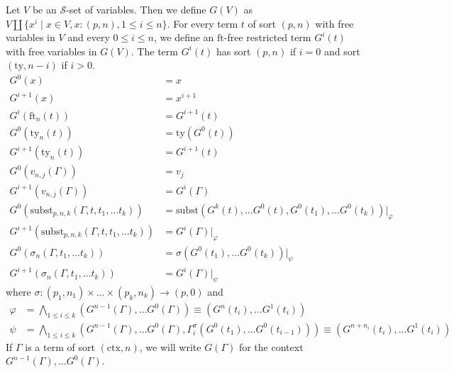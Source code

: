 \documentclass[reqno]{amsart}
\theoremstyle{definition}
\theoremstyle{remark}
\newcommand{\fs}[1]{\mathrm{#1}}
\newcommand{\subst}{\fs{subst}}
\newcommand{\ft}{\fs{ft}}
\newcommand{\ty}{\fs{ty}}
\newcommand{\ctx}{\fs{ctx}}
\numberwithin{figure}{section}
\begin{document}
Let $V$ be an $\mathcal{S}$-set of variables.
Then we define $G(V)$ as $V \amalg \{ x^i \mid x \in V, x : (p,n), 1 \leq i \leq n \}$.
For every term $t$ of sort $(p,n)$ with free variables in $V$ and every $0 \leq i \leq n$, we define an $\ft$-free restricted term $G^i(t)$ with free variables in $G(V)$.
The term $G^i(t)$ has sort $(p,n)$ if $i = 0$ and sort $(\ty,n-i)$ if $i > 0$.
\begin{align*}
G^0(x) & = x \\
G^{i+1}(x) & = x^{i+1} \\
G^i(\ft_n(t)) & = G^{i+1}(t) \\
G^0(\ty_n(t)) & = \ty(G^0(t)) \\
G^{i+1}(\ty_n(t)) & = G^{i+1}(t) \\
G^0(v_{n,j}(\Gamma)) & = v_j \\
G^{i+1}(v_{n,j}(\Gamma)) & = G^i(\Gamma) \\
G^0(\subst_{p,n,k}(\Gamma, t, t_1, \ldots t_k)) & = \subst(G^k(t), \ldots G^0(t), G^0(t_1), \ldots G^0(t_k))|_\varphi \\
G^{i+1}(\subst_{p,n,k}(\Gamma, t, t_1, \ldots t_k)) & = G^i(\Gamma)|_\varphi \\
G^0(\sigma_n(\Gamma, t_1, \ldots t_k)) & = \sigma(G^0(t_1), \ldots G^0(t_k))|_\psi \\
G^{i+1}(\sigma_n(\Gamma, t_1, \ldots t_k)) & = G^i(\Gamma)|_\psi
\end{align*}
where $\sigma : (p_1,n_1) \times \ldots \times (p_k,n_k) \to (p,0)$ and
\begin{align*}
\varphi & = \bigwedge_{1 \leq i \leq k} (G^{n-1}(\Gamma), \ldots G^0(\Gamma)) \equiv (G^n(t_i), \ldots G^1(t_i)) \\
\psi & = \bigwedge_{1 \leq i \leq k} (G^{n-1}(\Gamma), \ldots G^0(\Gamma), \Gamma^\sigma_i(G^0(t_1), \ldots G^0(t_{i-1}))) \equiv (G^{n+n_i}(t_i), \ldots G^1(t_i))
\end{align*}
If $\Gamma$ is a term of sort $(\ctx,n)$, we will write $G(\Gamma)$ for the context $G^{n-1}(\Gamma), \ldots G^0(\Gamma)$.
\end{document}
